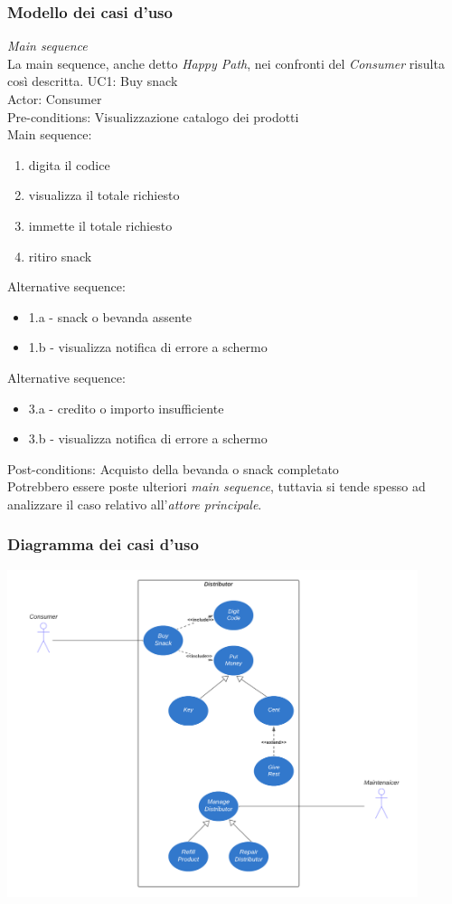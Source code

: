 \documentclass{article}
\begin{document}
\subsubsection*{Modello dei casi d'uso}
\textit{Main sequence}\\ La main sequence, anche detto \textit{Happy Path}, nei confronti del \textit{Consumer} risulta così descritta.\vspace{14pt}
UC1: Buy snack\\
Actor: Consumer\\
Pre-conditions: Visualizzazione catalogo dei prodotti\\
Main sequence:
\begin{enumerate}[label={\arabic* -}, leftmargin=3.65cm]
    \itemsep0em
    \item digita il codice
    \item visualizza il totale richiesto
    \item immette il totale richiesto
    \item ritiro snack
\end{enumerate}
Alternative sequence:
\begin{itemize}[label={ },leftmargin=3.02cm]
    \itemsep0em
    \item 1.a - snack o bevanda assente
    \item 1.b - visualizza notifica di errore a schermo
\end{itemize}
Alternative sequence: 
\begin{itemize}[label={ }, leftmargin=3.02cm]
    \itemsep0em
    \item 3.a - credito o importo insufficiente
    \item 3.b - visualizza notifica di errore a schermo
\end{itemize}
Post-conditions: Acquisto della bevanda o snack completato\vspace{14pt}\\
Potrebbero essere poste ulteriori \textit{main sequence}, tuttavia si tende spesso ad analizzare il caso relativo all'\textit{attore principale}.
\subsubsection*{Diagramma dei casi d'uso}
\begin{center}
    \includegraphics[width=0.9\textwidth]{foto 1.png}
\end{center}
\end{document}
